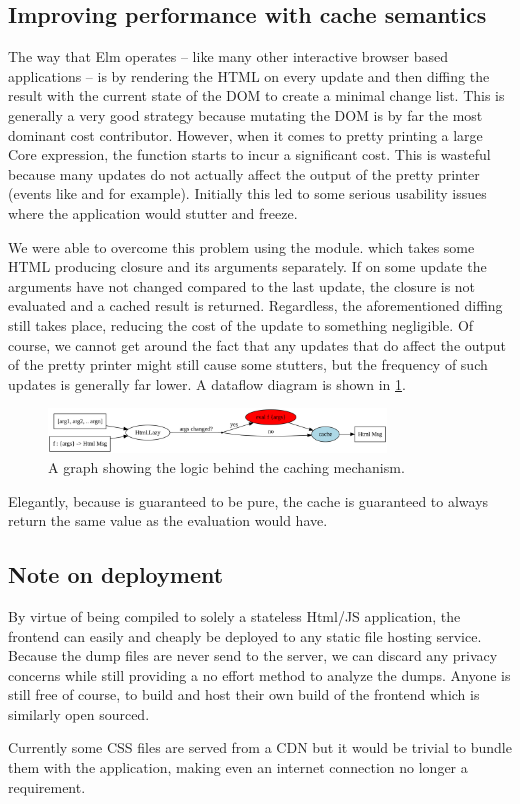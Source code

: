 \subsection{Improving performance with cache semantics}

The way that Elm operates -- like many other interactive browser based applications -- is by rendering the HTML on every
update and then diffing the result with the current state of the DOM to create a minimal change list. This is generally a very
good strategy because mutating the DOM is by far the most dominant cost contributor. However, when it comes to pretty printing a
large Core expression, the  function starts to incur a significant cost. This is wasteful because many updates do not
actually affect the output of the pretty printer (events like  and  for example).
Initially this led to some serious usability issues where the application would stutter and freeze.

We were able to overcome this problem using the  module. which takes some HTML producing closure and its arguments
separately. If on some update the arguments have not changed compared to the last update, the closure is not evaluated and a cached result is returned. Regardless,
the aforementioned diffing still takes place, reducing the cost of the update to something negligible. Of course, we cannot get around the fact that
any updates that do affect the output of the pretty printer might still cause some stutters, but the frequency of such updates is 
generally far lower. A dataflow diagram is shown in \cref{fig:elm_cache}.

\begin{figure}[H]
  \centering
  \includegraphics[width=0.8\textwidth]{figs/elm_cache.png}
  \caption{A graph showing the logic behind the caching mechanism.}
  \label{fig:elm_cache}
\end{figure}

Elegantly, because  is guaranteed to be pure, the cache is guaranteed to always return the same value as the evaluation would have.

\subsection{Note on deployment}

By virtue of being compiled to solely a stateless Html/JS application, the frontend can
easily and cheaply be deployed to any static file hosting service. Because the dump files are never send to the server,
we can discard any privacy concerns while still providing a no effort method to analyze the dumps. Anyone is still free
of course, to build and host their own build of the frontend which is similarly open sourced.

Currently some CSS files are served from a CDN but it would be trivial to bundle them with the application, making even
an internet connection no longer a requirement.

